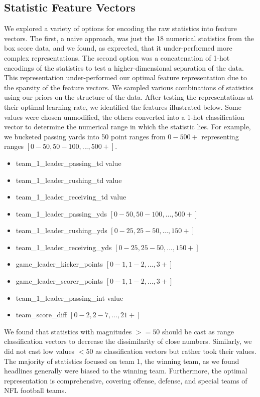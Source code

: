 \documentclass[12pt, journal]{IEEEtran}
\begin{document}
\subsection{Statistic Feature Vectors}
We explored a variety of options for encoding the raw statistics into feature vectors. The first, a naive approach, was just the 18 numerical statistics from the box score data, and we found, as exprected, that it under-performed more complex representations. The second option was a concatenation of 1-hot encodings of the statistics to test a higher-dimensional separation of the data. This representation under-performed our optimal feature representation due to the sparsity of the feature vectors. We sampled various combinations of statistics using our priors on the structure of the data. After testing the representations at their optimal learning rate, we identified the features illustrated below. Some values were chosen unmodified, the others converted into a 1-hot classification vector to determine the numerical range in which the statistic lies. For example, we bucketed passing yards into 50 point ranges from $0-500+$ representing ranges $[0-50, 50-100,..., 500+]$. 

\begin{itemize}
  \item team\_1\_leader\_passing\_td  value
  \item team\_1\_leader\_rushing\_td value
  \item team\_1\_leader\_receiving\_td value
  \item team\_1\_leader\_passing\_yds $[0-50, 50-100,..., 500+]$
  \item team\_1\_leader\_rushing\_yds $[0-25, 25-50,..., 150+]$
  \item team\_1\_leader\_receiving\_yds $[0-25, 25-50,..., 150+]$
  \item game\_leader\_kicker\_points $[0-1, 1-2,..., 3+]$
  \item game\_leader\_scorer\_points $[0-1, 1-2,..., 3+]$
  \item team\_1\_leader\_passing\_int value
  \item team\_score\_diff $[0-2, 2-7,..., 21+]$
\end{itemize}

We found that statistics with magnitudes $>= 50$ should be cast as range classification vectors to decrease the dissimilarity of close numbers. Similarly, we did not cast low values $< 50$ as classification vectors but rather took their values. The majority of statistics focused on team 1, the winning team, as we found headlines generally were biased to the winning team. Furthermore, the optimal representation is comprehensive, covering offense, defense, and special teams of NFL football teams. 
\end{document}
